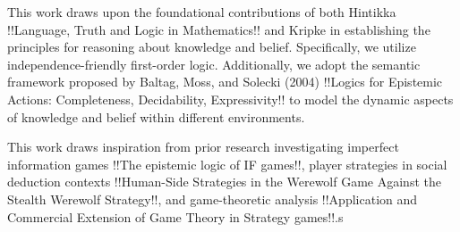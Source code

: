 This work draws upon the foundational contributions of both Hintikka
!!Language, Truth and Logic in Mathematics!! and Kripke in establishing the
principles for reasoning about knowledge and belief. Specifically, we utilize
independence-friendly first-order logic. Additionally, we adopt the semantic
framework proposed by Baltag, Moss, and Solecki (2004) !!Logics for Epistemic
Actions: Completeness, Decidability, Expressivity!! to model the dynamic
aspects of knowledge and belief within different environments.

This work draws inspiration from prior research investigating imperfect
information games !!The epistemic logic of IF games!!, player strategies in
social deduction contexts !!Human-Side Strategies in the Werewolf Game Against
the Stealth Werewolf Strategy!!, and game-theoretic analysis !!Application and
Commercial Extension of Game Theory in Strategy games!!.s